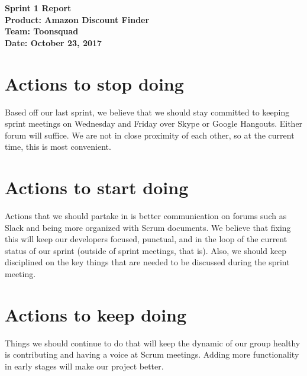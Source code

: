 \documentclass[11pt]{article}
\newcommand\tab[1][1cm]{\hspace*{#1}}
\begin{document}
	\Large{\textbf{Sprint 1 Report}}\\
	\Large{\textbf{Product: Amazon Discount Finder}}\\
	\Large{\textbf{Team: Toonsquad}}\\
	\Large{\textbf{Date: October 23, 2017}}\\
	
	\vspace{-3mm}
	
	\section{Actions to stop doing}
		\vspace{-3mm}
		\tab \normalsize{Based off our last sprint, we believe that we should stay committed to keeping sprint meetings on Wednesday and Friday over Skype or Google Hangouts. Either forum will suffice. We are not in close proximity of each other, so at the current time, this is most convenient.}
		
	\section{Actions to start doing}
		\vspace{-3mm}
		\tab \normalsize{Actions that we should partake in is better communication on forums such as Slack and being more organized with Scrum documents. We believe that fixing this will keep our developers focused, punctual, and in the loop of the current status of our sprint (outside of sprint meetings, that is). Also, we should keep disciplined on the key things that are needed to be discussed during the sprint meeting.}
		
	\section{Actions to keep doing}
		\vspace{-3mm}
		\tab \normalsize{Things we should continue to do that will keep the dynamic of our group healthy is contributing and having a voice at Scrum meetings. Adding more functionality in early stages will make our project better.}
		
\end{document}
